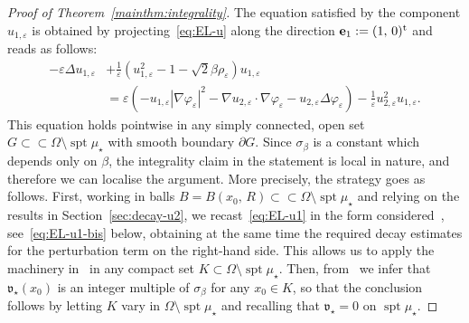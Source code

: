 \documentclass[a4paper, 11pt, twoside, leqno]{article}
\theoremstyle{definition}              %
\theoremstyle{remark}                  %
\DeclareMathOperator{\spt}{spt}                                     %
\newcommand{\abs}[1]{\left| #1 \right|}                             %
\newcommand{\csubset}{\subset\!\subset}                             %
\newcommand{\e}{\mathbf{e}}
\newcommand{\eps}{\varepsilon}
\begin{document}
\begin{proof}[{Proof of Theorem~\ref{mainthm:integrality}}]
	The equation satisfied by the component $u_{1,\eps}$ is obtained 
	by projecting~\eqref{eq:EL-u} along the direction $\e_1 := (1,\,0)^{\rm t}$ and reads as follows:
    \begin{equation}\label{eq:EL-u1}
    \begin{split}
        -\eps \Delta u_{1,\eps} &+ \frac{1}{\eps}\left(u_{1,\eps}^2 - 1 - \sqrt{2}\beta \rho_\eps \right)u_{1,\eps} \\
        &= \eps \left( -u_{1,\eps} \abs{\nabla \varphi_\eps}^2 - \nabla u_{2,\eps} \cdot \nabla \varphi_\eps - u_{2,\eps} \Delta \varphi_\eps \right) - \frac{1}{\eps}u_{2,\eps}^2 u_{1,\eps}.
    \end{split}
    \end{equation}
    This equation holds pointwise in any simply 
    connected, open set $G \csubset \Omega \setminus \spt\mu_\star$ 
    with smooth boundary $\partial G$. Since $\sigma_\beta$ is a constant 
    which depends only on $\beta$, the integrality claim in the 
    statement is local 
    in nature, and therefore we can localise the argument. More precisely, 
    the strategy goes as follows. First, working in balls 
    $B = B(x_0,\,R) \csubset \Omega \setminus \spt\mu_\star$ and relying on the 
    results in Section~\ref{sec:decay-u2}, we recast~\eqref{eq:EL-u1} 
    in the form considered~\cite{NagaseTonegawa}, see~\eqref{eq:EL-u1-bis} 
    below, obtaining at the same time the required decay estimates for the perturbation 
    term on the right-hand side.  
    This allows us to apply the machinery in~\cite{NagaseTonegawa} in any compact set 
    $K \subset \Omega \setminus \spt\mu_\star$.
    Then, from~\cite{NagaseTonegawa} we infer that 
    $\mathfrak{v}_\star(x_0)$ is an integer multiple of $\sigma_\beta$ for 
    any $x_0 \in K$, so that the conclusion follows by letting 
    $K$ vary in $\Omega \setminus \spt\mu_\star$ and recalling that 
    $\mathfrak{v}_\star = 0$ on $\spt \mu_\star$.
    
    

\end{proof}
\end{document}
